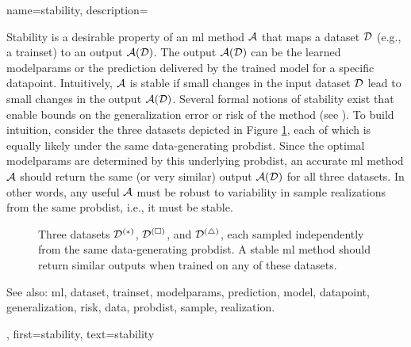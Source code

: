 {name={stability},
	description={Stability is a desirable property of an \gls{ml} method $\mathcal{A}$ that maps a 
		\gls{dataset} $\mathcal{D}$ (e.g., a \gls{trainset}) to an output $\mathcal{A}(\mathcal{D})$. The output 
		$\mathcal{A}(\mathcal{D})$ can be the learned \gls{modelparams} or the \gls{prediction} delivered 
		by the trained \gls{model} for a specific \gls{datapoint}. Intuitively, $\mathcal{A}$ is 
		stable if small changes in the input \gls{dataset} $\mathcal{D}$ lead to small changes in the 
		output $\mathcal{A}(\mathcal{D})$. Several formal notions of stability exist that enable bounds 
		on the \gls{generalization} error or \gls{risk} of the method (see \cite[Ch.~13]{ShalevMLBook}).
		To build intuition, consider the three \glspl{dataset} depicted in Figure \ref{fig_three_data_stability_dict}, each 
		of which is equally likely under the same \gls{data}-generating \gls{probdist}. Since the 
		optimal \gls{modelparams} are determined by this underlying \gls{probdist}, an accurate 
		\gls{ml} method $\mathcal{A}$ should return the same (or very similar) output $\mathcal{A}(\mathcal{D})$ 
		for all three \glspl{dataset}. In other words, any useful $\mathcal{A}$ must be robust to 
		variability in \gls{sample} \glspl{realization} from the same \gls{probdist}, i.e., it must be stable. 
		\begin{figure}[H]
			\centering
			\caption{Three \glspl{dataset} $\mathcal{D}^{(*)}$, $\mathcal{D}^{(\square)}$, and $\mathcal{D}^{(\triangle)}$, 
				each sampled independently from the same \gls{data}-generating \gls{probdist}. A stable \gls{ml} 
				method should return similar outputs when trained on any of these \glspl{dataset}. 
				\label{fig_three_data_stability_dict}}
		\end{figure}
		See also: \gls{ml}, \gls{dataset}, \gls{trainset}, \gls{modelparams}, \gls{prediction}, \gls{model}, \gls{datapoint}, \gls{generalization}, \gls{risk}, \gls{data}, \gls{probdist}, \gls{sample}, \gls{realization}.}, 
	first={stability}, 
	text={stability} 
}

